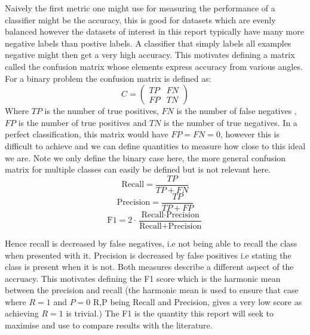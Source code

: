     Naively the first metric one might use for measuring the performance of a classifier
    might be the accuracy, this is good for datasets which are evenly balanced however
    the datasets of interest in this report typically have many more negative labels than postive labels.
    A classifier that simply labels all examples negative might then get a very high accuracy. This motivates
    defining a matrix called the confusion matrix whose elements express accuracy from various angles.
    For a binary problem the confusion matrix is defined as:
    \begin{equation}
      C =
      \begin{pmatrix}
        TP & FN\\
        FP & TN
      \end{pmatrix}
    \end{equation}
    Where $TP$ is the number of true positives, $FN$ is the number of false negatives
    , $FP$ is the number of true positives and $TN$ is the number of true negatives.
    In a perfect classification, this matrix would have $FP=FN=0$, however this is
    difficult to achieve
    and we can define quantities to measure how close to this ideal we are. Note we
    only define the binary case here, the more general confusion matrix for multiple
    classes can easily be defined but is not relevant here.
    \begin{equation}
      \text{Recall} = \frac{TP}{TP+FN}
    \end{equation}
    \begin{equation}
      \text{Precision} = \frac{TP}{TP+FP}
    \end{equation}
    \begin{equation}
      \text{F1} = 2 \cdot \frac{\text{Recall} \cdot \text{Precision}}{\text{Recall} + \text{Precision}}
    \end{equation}

    Hence recall is decreased by false negatives, i.e not being able to recall the class
    when presented with it. Precision is decreased by false positives i.e stating the class
    is present when it is not. Both measures describe a different aspect of the accruacy. This
    motivates defining the F1 score which is the harmonic mean between the precision and recall
    (the harmonic mean is used to ensure that case where $R=1$ and $P=0$ R,P being Recall and Precision, gives
    a very low score  as achieving $R=1$ is trivial.) The F1 is the quantity this report will seek to maximise and use to compare
    results with the literature.

